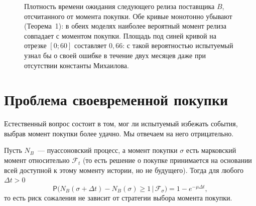 \documentclass[11pt,a4paper]{article}
\begin{document}
\begin{figure}[htbp]
\centering
{}
\caption{Плотность времени ожидания следующего релиза поставщика $B$, отсчитанного от момента покупки. Обе кривые монотонно убывают (Теорема~1): в обеих моделях наиболее вероятный момент релиза совпадает с моментом покупки. Площадь под синей кривой на отрезке $[0;60]$ составляет $0{,}66$: с такой вероятностью испытуемый узнал бы о своей ошибке в течение двух месяцев даже при отсутствии константы Михаилова.}
\label{fig:mode}
\end{figure}

\section{Проблема своевременной покупки}

Естественный вопрос состоит в том, мог ли испытуемый избежать события, выбрав момент покупки более удачно. Мы отвечаем на него отрицательно.

\begin{theorem}
Пусть $N_B$~--- пуассоновский процесс, а момент покупки $\sigma$ есть марковский момент относительно $\mathcal{F}_t$ (то есть решение о покупке принимается на основании всей доступной к этому моменту истории, но не будущего). Тогда для любого $\Delta t>0$
\[
\mathsf{P}\bigl(N_B(\sigma+\Delta t) - N_B(\sigma) \ge 1 \,\big|\, \mathcal{F}_\sigma\bigr) = 1 - e^{-\mu\Delta t},
\]
то есть риск сожаления не зависит от стратегии выбора момента покупки.
\end{theorem}
\end{document}
